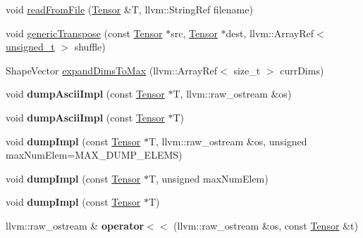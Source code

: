 \begin{DoxyCompactItemize}
void \hyperlink{namespaceglow_a327fb998231805cf69b6753e763e683f}{read\+From\+File} (\hyperlink{classglow_1_1_tensor}{Tensor} \&T, llvm\+::\+String\+Ref filename)
\item 
void \hyperlink{namespaceglow_a44d3450f4f150909deaf8e5939537d51}{generic\+Transpose} (const \hyperlink{classglow_1_1_tensor}{Tensor} $\ast$src, \hyperlink{classglow_1_1_tensor}{Tensor} $\ast$dest, llvm\+::\+Array\+Ref$<$ \hyperlink{namespaceglow_a0ca574644e1e42ef193a9947fb4d8911}{unsigned\+\_\+t} $>$ shuffle)
\item 
Shape\+Vector \hyperlink{namespaceglow_a384dccb23b7bc3ade84b8f5c64b1f136}{expand\+Dims\+To\+Max} (llvm\+::\+Array\+Ref$<$ size\+\_\+t $>$ curr\+Dims)
\item 
\mbox{\label{namespaceglow_a649c3f6ae28e295be486fb5917a8d885}} 
void {\bfseries dump\+Ascii\+Impl} (const \hyperlink{classglow_1_1_tensor}{Tensor} $\ast$T, llvm\+::raw\+\_\+ostream \&os)
\item 
\mbox{\label{namespaceglow_adb053ad1d1927c2af92cf37b53682c8d}} 
void {\bfseries dump\+Ascii\+Impl} (const \hyperlink{classglow_1_1_tensor}{Tensor} $\ast$T)
\item 
\mbox{\label{namespaceglow_a96c48cfb635307b862968dc772c85369}} 
void {\bfseries dump\+Impl} (const \hyperlink{classglow_1_1_tensor}{Tensor} $\ast$T, llvm\+::raw\+\_\+ostream \&os, unsigned max\+Num\+Elem=M\+A\+X\+\_\+\+D\+U\+M\+P\+\_\+\+E\+L\+E\+MS)
\item 
\mbox{\label{namespaceglow_a2c3020f7d0d4e127202551ea4d6d5f18}} 
void {\bfseries dump\+Impl} (const \hyperlink{classglow_1_1_tensor}{Tensor} $\ast$T, unsigned max\+Num\+Elem)
\item 
\mbox{\label{namespaceglow_a360ade90e7b5a953f3ecd3843e502dbb}} 
void {\bfseries dump\+Impl} (const \hyperlink{classglow_1_1_tensor}{Tensor} $\ast$T)
\item 
\mbox{\label{namespaceglow_a7ad1c389473834361bddd094fa014da5}} 
llvm\+::raw\+\_\+ostream \& {\bfseries operator$<$$<$} (llvm\+::raw\+\_\+ostream \&os, const \hyperlink{classglow_1_1_tensor}{Tensor} \&t)
\item 
\mbox{\label{namespaceglow_a9c06a31226910e776a2134f48daebdc1}} 

\end{DoxyCompactItemize}
